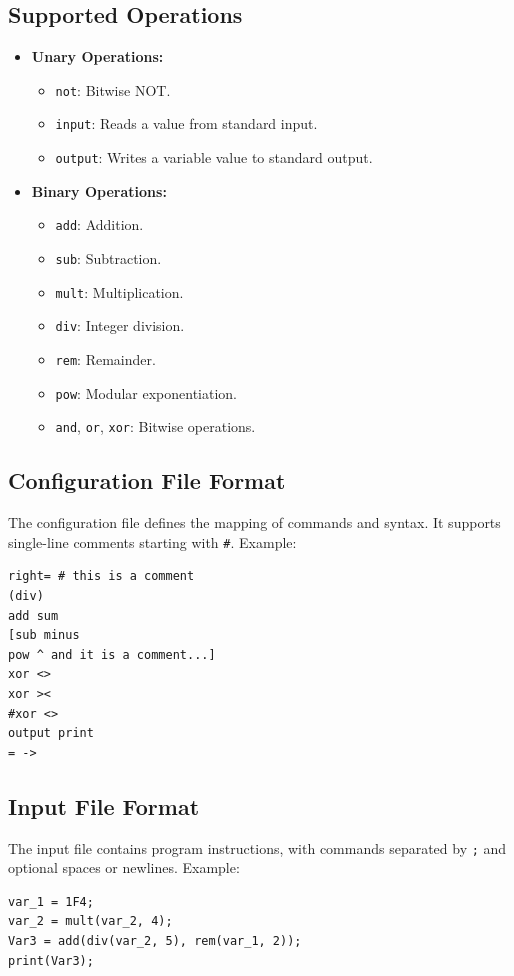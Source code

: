 \documentclass[a4paper,12pt]{article}
\begin{document}
\subsection{Supported Operations}
\begin{itemize}
	\item \textbf{Unary Operations:}
	      \begin{itemize}
		      \item \texttt{not}: Bitwise NOT.
		      \item \texttt{input}: Reads a value from standard input.
		      \item \texttt{output}: Writes a variable value to standard output.
	      \end{itemize}
	\item \textbf{Binary Operations:}
	      \begin{itemize}
		      \item \texttt{add}: Addition.
		      \item \texttt{sub}: Subtraction.
		      \item \texttt{mult}: Multiplication.
		      \item \texttt{div}: Integer division.
		      \item \texttt{rem}: Remainder.
		      \item \texttt{pow}: Modular exponentiation.
		      \item \texttt{and}, \texttt{or}, \texttt{xor}: Bitwise operations.
	      \end{itemize}
\end{itemize}

\subsection{Configuration File Format}
The configuration file defines the mapping of commands and syntax. It supports single-line comments starting with \texttt{\#}. Example:
\begin{lstlisting}
right= # this is a comment
(div)
add sum
[sub minus
pow ^ and it is a comment...]
xor <>
xor ><
#xor <>
output print
= ->
\end{lstlisting}


\subsection{Input File Format}
The input file contains program instructions, with commands separated by \texttt{;} and optional spaces or newlines. Example:
\begin{lstlisting}
var_1 = 1F4;
var_2 = mult(var_2, 4);
Var3 = add(div(var_2, 5), rem(var_1, 2));
print(Var3);
\end{lstlisting}
\end{document}
